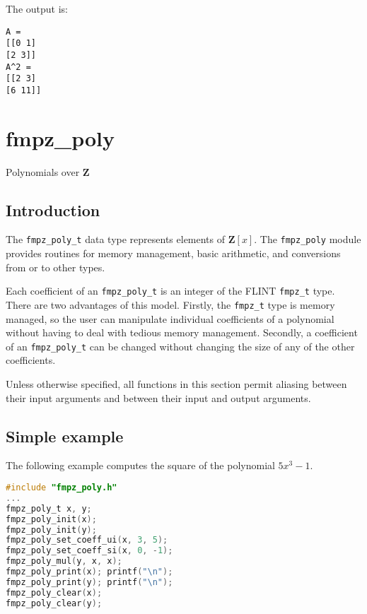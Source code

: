 \documentclass[a4paper,10pt]{book}
\newcommand{\Z}{\mathbf{Z}}%
\newcommand{\code}{\lstinline}
\begin{document}
The output is:
\begin{lstlisting}
A = 
[[0 1]
[2 3]]
A^2 = 
[[2 3]
[6 11]]
\end{lstlisting}





\chapter{fmpz\_poly}
\epigraph{Polynomials over $\Z$}{}

\section{Introduction}

The \code{fmpz_poly_t} data type represents elements of $\Z[x]$. The 
\code{fmpz_poly} module provides routines for memory management, basic 
arithmetic, and conversions from or to other types.

Each coefficient of an \code{fmpz_poly_t} is an integer of the FLINT 
\code{fmpz_t} type.  There are two advantages of this model.  Firstly, 
the \code{fmpz_t} type is memory managed, so the user can manipulate 
individual coefficients of a polynomial without having to deal with 
tedious memory management.  Secondly, a coefficient of an 
\code{fmpz_poly_t} can be changed without changing the size of any 
of the other coefficients.

Unless otherwise specified, all functions in this section permit aliasing 
between their input arguments and between their input and output arguments.

\section{Simple example}

The following example computes the square of the polynomial $5x^3 - 1$.
\begin{lstlisting}[language=c]
#include "fmpz_poly.h"
...
fmpz_poly_t x, y;
fmpz_poly_init(x);
fmpz_poly_init(y);
fmpz_poly_set_coeff_ui(x, 3, 5);
fmpz_poly_set_coeff_si(x, 0, -1);
fmpz_poly_mul(y, x, x);
fmpz_poly_print(x); printf("\n");
fmpz_poly_print(y); printf("\n");
fmpz_poly_clear(x);
fmpz_poly_clear(y);
\end{lstlisting}
\end{document}
